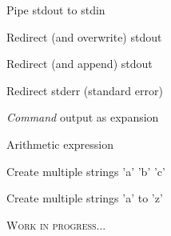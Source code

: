 \documentclass[12pt, a4paper]
{article}
\begin{document}
\begin{multicols}{3}

\begin{description}[nolistsep]
	\item[|] Pipe stdout to stdin
	\item[>] Redirect (and overwrite) stdout
	\item[>>] Redirect (and append) stdout 
	\item[2>] Redirect stderr (standard error)
\end{description}


\begin{description}[nolistsep]
	\item[\$({\large \textit{command}})] \textit{Command} output as expansion
	\item[\$(({\large \textit{expression}}))] Arithmetic expression 
	\item[\{a,b,c\}] Create multiple strings 'a' 'b' 'c' 
	\item[\{a..z\}] Create multiple strings 'a' to 'z'
\end{description}



\end{multicols}

\begin{center}
	\Huge \textsc{Work in progress...}
\end{center}
\end{document}
